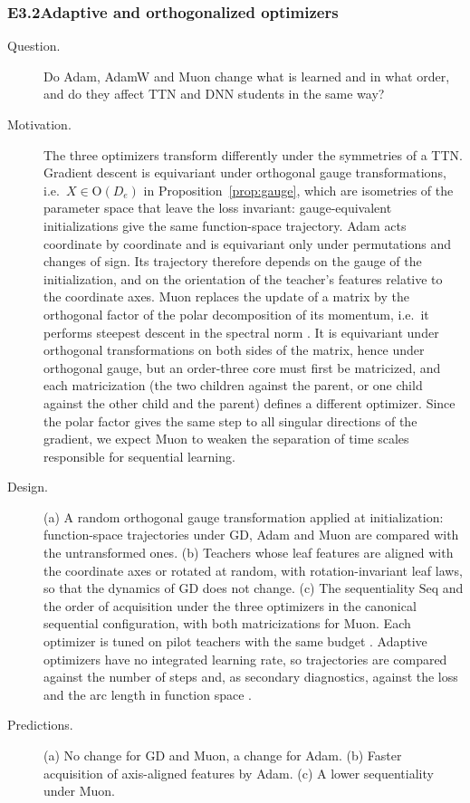 \documentclass[11pt]{article}
\theoremstyle{definition}
\numberwithin{equation}{section}
\begin{document}
\subsubsection*{E3.2\quad Adaptive and orthogonalized optimizers}
\begin{description}
\item[Question.] Do Adam, AdamW and Muon change what is learned and in what order, and do they affect TTN and DNN students in the same way?
\item[Motivation.] The three optimizers transform differently under the symmetries of a TTN. Gradient descent is equivariant under orthogonal gauge transformations, i.e.\ $X\in\mathrm O(D_e)$ in Proposition~\ref{prop:gauge}, which are isometries of the parameter space that leave the loss invariant: gauge-equivalent initializations give the same function-space trajectory. Adam \citep{kingma2015adam,loshchilov2019decoupled} acts coordinate by coordinate and is equivariant only under permutations and changes of sign. Its trajectory therefore depends on the gauge of the initialization, and on the orientation of the teacher's features relative to the coordinate axes. Muon \citep{jordan2024muon} replaces the update of a matrix by the orthogonal factor of the polar decomposition of its momentum, i.e.\ it performs steepest descent in the spectral norm \citep{bernstein2024old}. It is equivariant under orthogonal transformations on both sides of the matrix, hence under orthogonal gauge, but an order-three core must first be matricized, and each matricization (the two children against the parent, or one child against the other child and the parent) defines a different optimizer. Since the polar factor gives the same step to all singular directions of the gradient, we expect Muon to weaken the separation of time scales responsible for sequential learning.
\item[Design.] (a) A random orthogonal gauge transformation applied at initialization: function-space trajectories under GD, Adam and Muon are compared with the untransformed ones. (b) Teachers whose leaf features are aligned with the coordinate axes or rotated at random, with rotation-invariant leaf laws, so that the dynamics of GD does not change. (c) The sequentiality $\mathrm{Seq}$ and the order of acquisition under the three optimizers in the canonical sequential configuration, with both matricizations for Muon. Each optimizer is tuned on pilot teachers with the same budget \citep{schmidt2021descending}. Adaptive optimizers have no integrated learning rate, so trajectories are compared against the number of steps and, as secondary diagnostics, against the loss and the arc length in function space \citep[Section~8.5]{hfl_surrogate}.
\item[Predictions.] (a) No change for GD and Muon, a change for Adam. (b) Faster acquisition of axis-aligned features by Adam. (c) A lower sequentiality under Muon.
\end{description}
\end{document}
